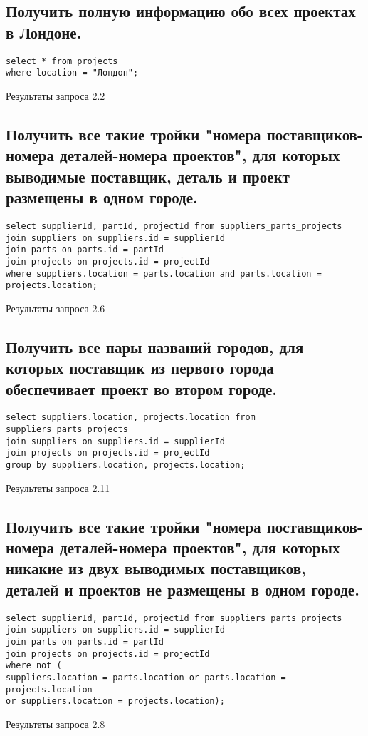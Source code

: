 \documentclass[a4paper,8pt]{article}
\begin{document}
\subsection{Получить полную информацию обо всех проектах в Лондоне.}
\begin{verbatim}
select * from projects
where location = "Лондон";
\end{verbatim}
\begin{table}[H]
\centering

\caption{Результаты запроса 2.2}
\end{table}

\subsection{Получить все такие тройки "номера поставщиков-номера деталей-номера проектов", для которых выводимые поставщик, деталь и проект размещены в одном городе.}
\begin{verbatim}
select supplierId, partId, projectId from suppliers_parts_projects
join suppliers on suppliers.id = supplierId
join parts on parts.id = partId
join projects on projects.id = projectId
where suppliers.location = parts.location and parts.location = projects.location;
\end{verbatim}
\begin{table}[H]
\centering

\caption{Результаты запроса 2.6}
\end{table}

\subsection{Получить все пары названий городов, для которых поставщик из первого города обеспечивает проект во втором городе.}
\begin{verbatim}
select suppliers.location, projects.location from suppliers_parts_projects
join suppliers on suppliers.id = supplierId
join projects on projects.id = projectId
group by suppliers.location, projects.location;
\end{verbatim}
\begin{table}[H]
\centering

\caption{Результаты запроса 2.11}
\end{table}

\subsection{Получить все такие тройки "номера поставщиков-номера деталей-номера проектов", для которых никакие из двух выводимых поставщиков, деталей и проектов не размещены в одном городе.}
\begin{verbatim}
select supplierId, partId, projectId from suppliers_parts_projects
join suppliers on suppliers.id = supplierId
join parts on parts.id = partId
join projects on projects.id = projectId
where not (
suppliers.location = parts.location or parts.location = projects.location
or suppliers.location = projects.location);
\end{verbatim}
\begin{table}[H]
\centering

\caption{Результаты запроса 2.8}
\end{table}
\end{document}
